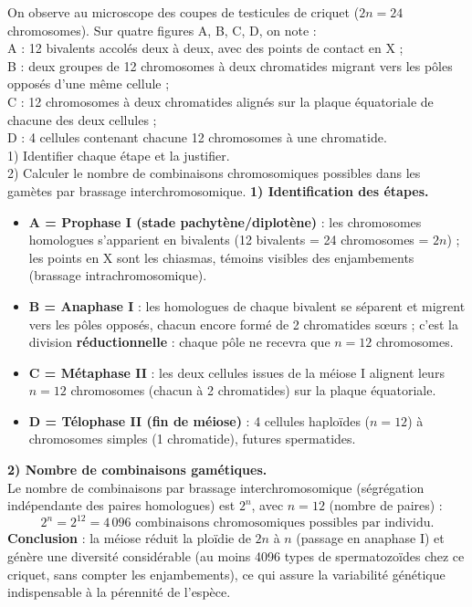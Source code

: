 \documentclass[11pt]{article}
\newcommand{\cle}[1]{{\popxbold\color{popdark}#1}}
\begin{document}
\begin{exoresolu}
On observe au microscope des coupes de testicules de criquet ($2n = 24$ chromosomes). Sur quatre figures A, B, C, D, on note :\\
A : 12 bivalents accolés deux à deux, avec des points de contact en X ;\\
B : deux groupes de 12 chromosomes à deux chromatides migrant vers les pôles opposés d'une même cellule ;\\
C : 12 chromosomes à deux chromatides alignés sur la plaque équatoriale de chacune des deux cellules ;\\
D : 4 cellules contenant chacune 12 chromosomes à une chromatide.\\
1) Identifier chaque étape et la justifier.\\
2) Calculer le nombre de combinaisons chromosomiques possibles dans les gamètes par brassage interchromosomique.
\tcblower
\textbf{1) Identification des étapes.}
\begin{itemize}
\item \textbf{A = Prophase I (stade pachytène/diplotène)} : les chromosomes homologues s'apparient en \cle{bivalents} (12 bivalents = 24 chromosomes = $2n$) ; les points en X sont les \cle{chiasmas}, témoins visibles des enjambements (brassage intrachromosomique).
\item \textbf{B = Anaphase I} : les homologues de chaque bivalent se séparent et migrent vers les pôles opposés, chacun encore formé de 2 chromatides sœurs ; c'est la division \textbf{réductionnelle} : chaque pôle ne recevra que $n = 12$ chromosomes.
\item \textbf{C = Métaphase II} : les deux cellules issues de la méiose I alignent leurs $n = 12$ chromosomes (chacun à 2 chromatides) sur la plaque équatoriale.
\item \textbf{D = Télophase II (fin de méiose)} : 4 cellules haploïdes ($n = 12$) à chromosomes simples (1 chromatide), futures spermatides.
\end{itemize}
\textbf{2) Nombre de combinaisons gamétiques.}\\
Le nombre de combinaisons par brassage interchromosomique (ségrégation indépendante des paires homologues) est $2^{n}$, avec $n = 12$ (nombre de paires) :
\[ 2^{n} = 2^{12} = 4\,096 \text{ combinaisons chromosomiques possibles par individu.} \]
\textbf{Conclusion} : la méiose réduit la ploïdie de $2n$ à $n$ (passage en anaphase I) et génère une diversité considérable (au moins 4096 types de spermatozoïdes chez ce criquet, sans compter les enjambements), ce qui assure la variabilité génétique indispensable à la pérennité de l'espèce.
\end{exoresolu}
\end{document}
